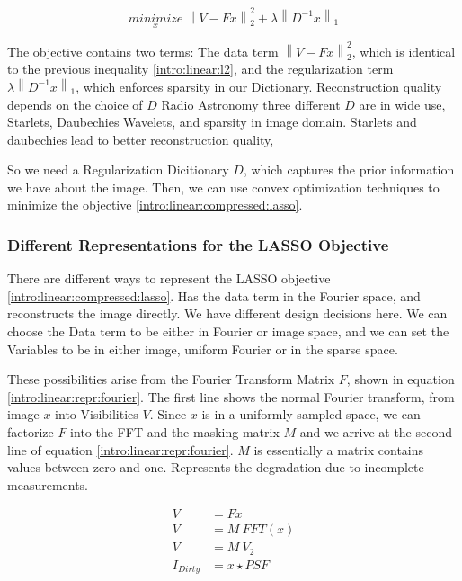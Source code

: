 \begin{equation}\label{intro:linear:compressed:lasso}
\underset{x}{minimize} \: \left \| V - Fx \right \|_2^2 + \lambda \left \| D^{-1}x \right \|_1 
\end{equation}

The objective contains two terms: The data term $\left \| V - Fx \right \|_2^2$, which is identical to the previous inequality \eqref{intro:linear:l2}, and the regularization term $\lambda \left \| D^{-1}x \right \|_1$, which enforces sparsity in our Dictionary.
Reconstruction quality depends on the choice of $D$
Radio Astronomy three different $D$ are in wide use, Starlets, Daubechies Wavelets, and sparsity in image domain.
Starlets and daubechies lead to better reconstruction quality, 

So we need a Regularization Dicitionary $D$, which captures the prior information we have about the image. Then, we can use convex optimization techniques to minimize the objective \eqref{intro:linear:compressed:lasso}.


\subsubsection{Different Representations for the LASSO Objective}\label{intro:linear:repr}

There are different ways to represent the LASSO objective \eqref{intro:linear:compressed:lasso}. Has the data term in the Fourier space, and reconstructs the image directly. We have different design decisions here. We can choose the Data term to be either in Fourier or image space, and we can set the Variables to be in either image, uniform Fourier or in the sparse space.

These possibilities arise from the Fourier Transform Matrix $F$, shown in equation \eqref{intro:linear:repr:fourier}. The first line shows the normal Fourier transform, from image $x$ into Visibilities $V$. Since $x$ is in a uniformly-sampled space, we can factorize $F$ into the FFT and the masking matrix $M$ and we arrive at the second line of equation \eqref{intro:linear:repr:fourier}. $M$ is essentially a matrix contains values between zero and one.
Represents the degradation due to incomplete measurements. 

\begin{equation} \label{intro:linear:repr:fourier}
\begin{split}
V &= Fx\\
V &= M\: FFT(x)\\
V &= M\: V_2\\
I_{Dirty} &= x \star PSF
\end{split}
\end{equation}

